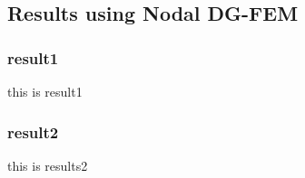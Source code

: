 \subsection{Results using Nodal DG-FEM}

\begin{frame}
	\frametitle{result1}
	this is result1
\end{frame}

\begin{frame}
	\frametitle{result2}
	this is results2
\end{frame}